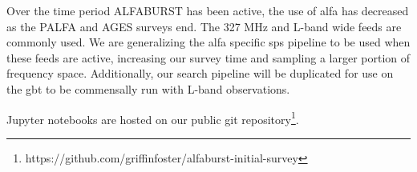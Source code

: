 \documentclass[a4paper,fleqn,usenatbib]{mnras}
\begin{document}
Over the time period ALFABURST has been active, the use of \gls*{alfa} has
decreased as the PALFA and AGES surveys end. The 327 MHz and L-band wide feeds
are commonly used. We are generalizing the \gls*{alfa} specific \gls*{sps}
pipeline to be used when these feeds are active, increasing our survey time and
sampling a larger portion of frequency space. Additionally, our search pipeline
will be duplicated for use on the \gls*{gbt} to be commensally run with L-band
observations. 

Jupyter notebooks are hosted on our public git
repository\footnote{https://github.com/griffinfoster/alfaburst-initial-survey}.


 

\bsp	%
\label{lastpage}
\end{document}
